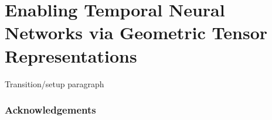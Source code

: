\chapter{Enabling Temporal Neural Networks via Geometric Tensor Representations} \label{chap:ott} 

Transition/setup paragraph







\subsection{Acknowledgements}

